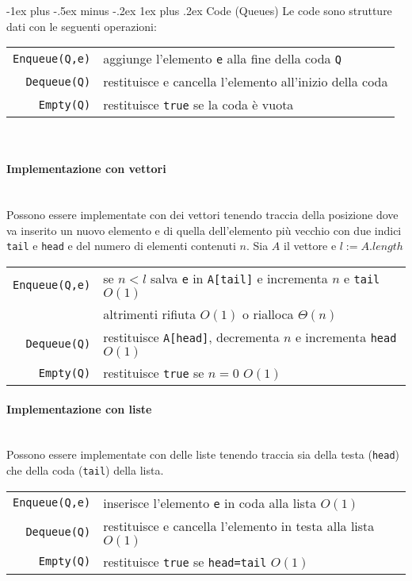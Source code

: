 \documentclass[10pt,landscape]{article}
\makeatletter
\renewcommand{\subsubsection}{\@startsection{subsubsection}{3}{0mm}%
                                {-1ex plus -.5ex minus -.2ex}%
                                {1ex plus .2ex}%
                                {\normalfont\normalsize\bfseries}}
\newcommand{\myparagraph}[1]{\paragraph{#1}\mbox{}\\ [5pt]}
\makeatother
\begin{document}
\begin{multicols*}{4}
                \subsubsection{Code (Queues)}
                Le code sono strutture dati con le seguenti operazioni:\\[3pt]
                \begin{tabular}{rl}
                        \verb|Enqueue(Q,e)| & aggiunge l'elemento \verb|e| alla fine della coda \verb|Q| \\
                        \verb|Dequeue(Q)|   & restituisce e cancella l'elemento all'inizio della coda    \\
                        \verb|Empty(Q)|     & restituisce \verb|true| se la coda è vuota                 \\
                \end{tabular}\\ [3pt]
                \myparagraph{Implementazione con vettori}
                Possono essere implementate con dei vettori tenendo traccia della posizione dove va inserito un nuovo elemento e di quella dell'elemento più vecchio con due indici \verb|tail| e \verb|head| e del numero di elementi contenuti $n$. Sia $A$ il vettore e $l := A.length$  \\ [3pt]
                \begin{tabular}{rl}
                        \verb|Enqueue(Q,e)| & se $n < l$ salva \verb|e| in \verb|A[tail]| e incrementa $n$ e \verb|tail|  $O(1)$ \\
                                            & altrimenti rifiuta $O(1)$ o rialloca $\Theta(n)$                                   \\
                        \verb|Dequeue(Q)|   & restituisce \verb|A[head]|, decrementa $n$ e incrementa \verb|head|        $O(1)$  \\
                        \verb|Empty(Q)|     & restituisce \verb|true| se $n=0$                                           $O(1)$  \\
                \end{tabular}
                \myparagraph{Implementazione con liste}
                Possono essere implementate con delle liste tenendo traccia sia della testa (\verb|head|) che della coda (\verb|tail|) della lista. \\ [3pt]
                \begin{tabular}{rl}
                        \verb|Enqueue(Q,e)| & inserisce l'elemento \verb|e| in coda alla lista       $O(1)$ \\
                        \verb|Dequeue(Q)|   & restituisce e cancella l'elemento in testa alla lista  $O(1)$ \\
                        \verb|Empty(Q)|     & restituisce \verb|true| se \verb|head=tail|            $O(1)$ \\
                \end{tabular}


\end{multicols*}
\end{document}
